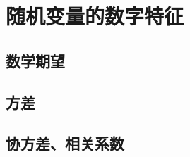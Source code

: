 \chapter{随机变量的数字特征}

\section{数学期望}
\label{sec:数学期望}

\section{方差}
\label{sec:方差}

\section{协方差、相关系数}
\label{sec:协方差_相关系数}
